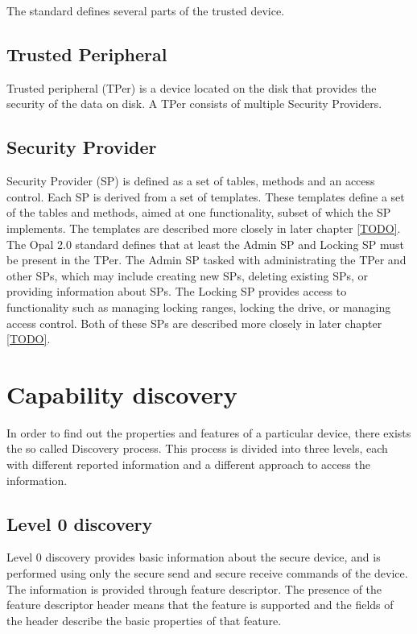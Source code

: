 The standard defines several parts of the trusted device.

\subsection{Trusted Peripheral}

Trusted peripheral (TPer) is a device located on the disk that provides the security of the data on disk. A TPer consists of multiple Security Providers.

\subsection{Security Provider}

Security Provider (SP) is defined as a set of tables, methods and an access control. Each SP is derived from a set of templates. These templates define a set of the tables and methods, aimed at one functionality, subset of which the SP implements. The templates are described more closely in later chapter \ref{TODO}.
The Opal 2.0 standard defines that at least the Admin SP and Locking SP must be present in the TPer. The Admin SP tasked with administrating the TPer and other SPs, which may include creating new SPs, deleting existing SPs, or providing information about SPs. The Locking SP provides access to functionality such as managing locking ranges, locking the drive, or managing access control. Both of these SPs are described more closely in later chapter \ref{TODO}.

\section{Capability discovery}

In order to find out the properties and features of a particular device, there exists the so called Discovery process. This process is divided into three levels, each with different reported information and a different approach to access the information.

\subsection{Level 0 discovery}

Level 0 discovery provides basic information about the secure device, and is performed using only the secure send and secure receive commands of the device. The information is provided through feature descriptor. The presence of the feature descriptor header means that the feature is supported and the fields of the header describe the basic properties of that feature.

